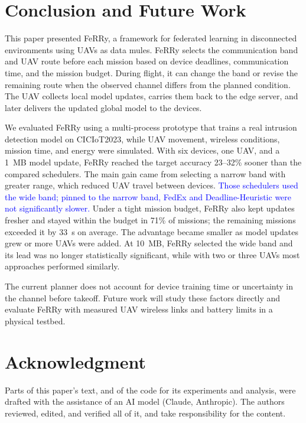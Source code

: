 \documentclass[conference]{IEEEtran}
\newcommand{\sysname}{FeRRy}
\begin{document}
\section{Conclusion and Future Work}
\label{sec:conclusion}

This paper presented \sysname{}, a framework for federated learning in
disconnected environments using UAVs as data mules. \sysname{} selects the
communication band and UAV route before each mission based on device deadlines,
communication time, and the mission budget. During flight, it can change the
band or revise the remaining route when the observed channel differs from the
planned condition. The UAV collects local model updates, carries them back to
the edge server, and later delivers the updated global model to the devices.

We evaluated \sysname{} using a multi-process prototype that trains a real
intrusion detection model on CICIoT2023, while UAV movement, wireless
conditions, mission time, and energy were simulated. With six devices, one UAV,
and a 1~MB model update, \sysname{} reached the target accuracy 23--32\% sooner
than the compared schedulers. The main gain came from selecting a narrow band
with greater range, which reduced UAV travel between devices. \textcolor{blue}{Those schedulers used the wide band; pinned to the narrow band, FedEx and
Deadline-Heuristic were not significantly slower.} Under a tight
mission budget, \sysname{} also kept updates fresher and stayed within the
budget in 71\% of missions; the remaining missions exceeded it by 33~s on
average. The advantage became smaller as model updates grew or more UAVs were
added. At 10~MB, \sysname{} selected the wide band and its lead was no longer
statistically significant, while with two or three UAVs most approaches
performed similarly.

The current planner does not account for device training time or uncertainty in
the channel before takeoff. Future work will study these factors directly and
evaluate \sysname{} with measured UAV wireless links and battery limits in a
physical testbed.

\section*{Acknowledgment}
Parts of this paper's text, and of the code for its experiments and analysis,
were drafted with the assistance of an AI model (Claude, Anthropic). The authors
reviewed, edited, and verified all of it, and take responsibility for the
content.



\end{document}

